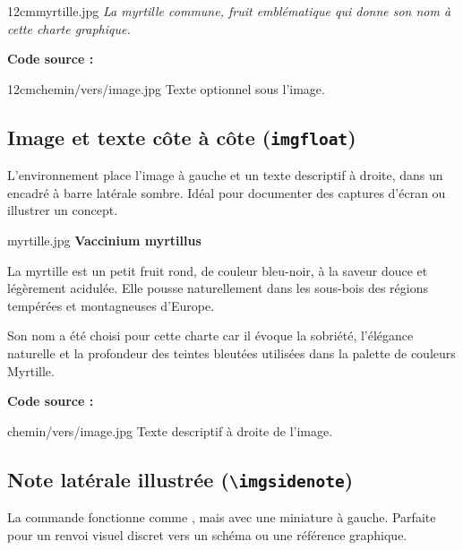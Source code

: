 \begin{imgbox}{12cm}{myrtille.jpg}
  \footnotesize\color{mid}\textit{La myrtille commune, fruit emblématique qui donne son nom à cette charte graphique.}
\end{imgbox}

\textbf{Code source :}
\begin{texblock}
\begin{imgbox}{12cm}{chemin/vers/image.jpg} %
  Texte optionnel sous l'image.
\end{imgbox}
\end{texblock}

\subsection{Image et texte côte à côte (\texttt{imgfloat})}

L'environnement  place l'image à gauche et un texte descriptif à droite, dans un encadré à barre latérale sombre. Idéal pour documenter des captures d'écran ou illustrer un concept.

\begin{imgfloat}{myrtille.jpg}
  \textbf{Vaccinium myrtillus}

  La myrtille est un petit fruit rond, de couleur bleu-noir, à la saveur douce et légèrement acidulée. Elle pousse naturellement dans les sous-bois des régions tempérées et montagneuses d'Europe.

  \vspace{4pt}
  Son nom a été choisi pour cette charte car il évoque la sobriété, l'élégance naturelle et la profondeur des teintes bleutées utilisées dans la palette de couleurs Myrtille.
\end{imgfloat}

\textbf{Code source :}
\begin{texblock}
\begin{imgfloat}{chemin/vers/image.jpg}
  Texte descriptif à droite de l'image.
\end{imgfloat}
\end{texblock}

\subsection{Note latérale illustrée (\texttt{\textbackslash imgsidenote})}

La commande  fonctionne comme , mais avec une miniature à gauche. Parfaite pour un renvoi visuel discret vers un schéma ou une référence graphique.

